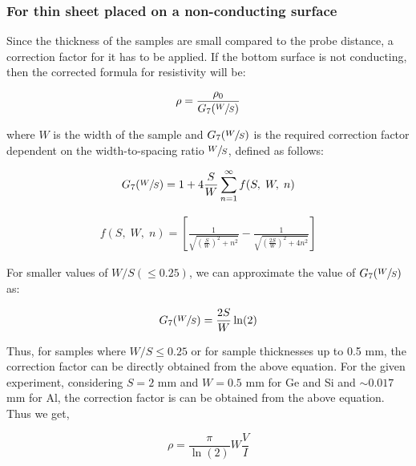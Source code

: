 \subsubsection*{For thin sheet placed on a non-conducting surface}
Since the thickness of the samples are small compared to the probe distance, a correction factor for it has to be applied. If the bottom surface is not conducting, then the corrected formula for resistivity will be:

\begin{align}\rho = \frac{\rho_0}{G_7(\sfrac{W}{S})}\end{align}

where $W$ is the width of the sample and $G_7(\sfrac{W}{S})$ is the required correction factor dependent
on the width-to-spacing ratio $\sfrac{W}{S}$, defined as follows:

\begin{align}
    G_7(\sfrac{W}{S}) = 1 + 4 \frac{S}{W}\sum_{n=1}^{\infty} f(S,\;W,\;n) 
\end{align}

\begin{align}
    f(S,\;W,\;n) = \left[\frac{1}{\sqrt{\left(\frac{S}{W}\right)^2+n^2}} - \frac{1}{\sqrt{\left(\frac{2S}{W}\right)^2+4n^2}}\right]
\end{align}

For smaller values of $W/S (\le 0.25)$, we can approximate the value of $G_7(\sfrac{W}{S})$ as:

\begin{align}
    G_7(\sfrac{W}{S}) = \frac{2S}{W}\ln(2)
\end{align}

Thus, for samples where $W/S \le 0.25$ or for sample thicknesses up to 0.5 mm, the correction factor can be directly obtained from the above equation.
For the given experiment, considering $S = 2$ mm
and $W = 0.5$ mm for Ge and Si and $\sim 0.017$ mm for Al, the correction factor is can be obtained from the above equation. Thus we get,

\begin{equation}\label{e2}
    \rho = \frac{\pi}{\ln(2)}W\frac{V}{I}
\end{equation}


